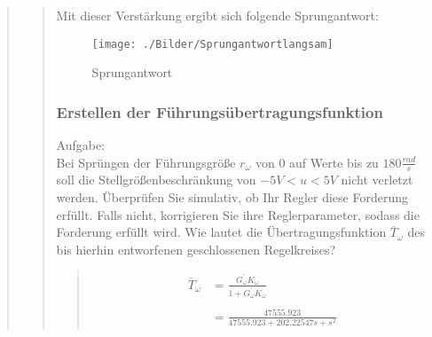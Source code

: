 \begin{quote}
\begin{quote}
        Mit dieser Verstärkung ergibt sich folgende Sprungantwort:
        \begin{figure}[H]
        \centering
            \texttt{[image: ./Bilder/Sprungantwortlangsam]}
                \caption{Sprungantwort}
        \end{figure}
        
        
        
        \subsubsection{Erstellen der Führungsübertragungsfunktion}
        \label{2d}
        Aufgabe:\\
        Bei Sprüngen der Führungsgröße $r_\omega$ von $0$ auf Werte bis zu $180 \frac{rad}{s}$ soll die Stellgrößenbeschränkung
        von $−5V < u < 5V$ nicht verletzt werden. Überprüfen Sie simulativ, ob Ihr Regler diese Forderung erfüllt. Falls nicht,
        korrigieren Sie ihre Reglerparameter, sodass die Forderung erfüllt wird.
        Wie lautet die Übertragungsfunktion $\overline{T}_\omega$ des bis hierhin entworfenen geschlossenen Regelkreises?
        \begin{quote}
            
            \begin{equation*}
            	\begin{split}
            		\overline{T}_\omega &= \frac{G_\omega^{'} K_\omega}{1 + G_\omega^{'} K_\omega}\\ \\
            		&= \frac{47555.923}{47555.923 + 202.22547 s + s^2}
            	\end{split}
            \end{equation*}
        \end{quote}
        

\end{quote}
\end{quote}

